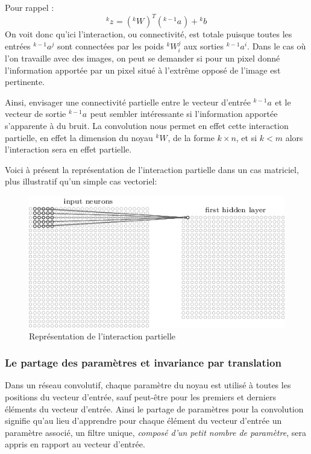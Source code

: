 \documentclass[a4paper, 10pt]{report}
\newcommand{\lexp}[1]{\phantom{}^{#1}}
\newcommand{\elem}[4]{\lexp{#2}#1^{#3}_{#4}}
\begin{document}
Pour rappel :
$$\elem{z}{k}{}{} = (\elem{W}{k}{}{})^T(\elem{a}{k-1}{}{}) + \elem{b}{k}{}{}$$
On voit donc qu'ici l'interaction, ou connectivité, est totale puisque toutes les entrées $\elem{a}{k-1}{j}{}$ sont connectées par les poids $\elem{W}{k}{j}{i}$ aux sorties $\elem{a}{k-1}{i}{}$.
Dans le cas où l'on travaille avec des images, on peut se demander si pour un pixel donné l'information apportée par un pixel situé à l'extrême opposé de l'image est pertinente.

Ainsi, envisager une connectivité partielle entre le vecteur d'entrée $\elem{a}{k-1}{}{}$ et le vecteur de sortie $\elem{a}{k-1}{}{}$ peut sembler intéressante si l'information apportée s'apparente à du bruit.
La convolution nous permet en effet cette interaction partielle, en effet la dimension du noyau $\elem{W}{k}{}{}$, de la forme $k \times n$, et si $k < m$ alors l'interaction sera en effet partielle.

Voici à présent la représentation de l'interaction partielle dans un cas matriciel, plus illustratif qu'un simple cas vectoriel:
\begin{figure}[H]
	\begin{center}
		\includegraphics[scale=0.60]{Images/Convolution_Layer.png}
		\caption{Représentation de l'interaction partielle}
	\end{center}
\end{figure}
			
\subsubsection{Le partage des paramètres et invariance par translation}
Dans un réseau convolutif, chaque paramètre du noyau est utilisé à toutes les positions du vecteur d'entrée, sauf peut-être pour les premiers et derniers éléments du vecteur d'entrée.
Ainsi le partage de paramètres pour la convolution signifie qu'au lieu d'apprendre pour chaque élément du vecteur d'entrée un paramètre associé, un filtre unique, \emph{composé d'un petit nombre de paramètre}, sera appris en rapport au vecteur d'entrée.
\end{document}
